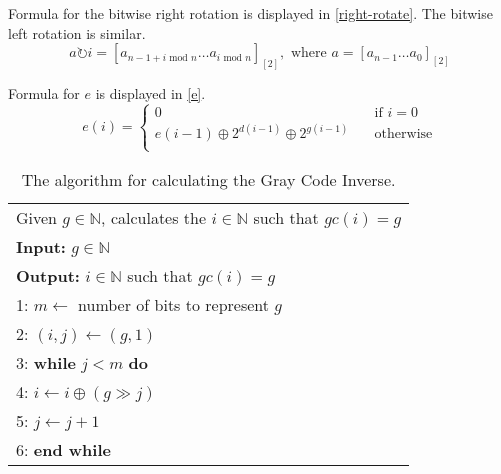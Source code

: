 \documentclass[10pt]{article}
\begin{document}
Formula for the bitwise right rotation is displayed in \ref{right-rotate}. The bitwise left rotation is similar.
\begin{equation}
  \label{right-rotate}
  a \rightturn i = \left[ a_{n - 1 + i\text{ mod }n} \ldots a_{i\text{ mod }n} \right]_{\left[ 2 \right]}, \text{ where } a = \left[ a_{n-1} \ldots a_0\right]_{\left[ 2 \right]} 
\end{equation}


Formula for $e$ is displayed in \ref{e}.
\begin{equation}
  \label{e}
  e(i) =  
    \begin{cases}
      0 & \quad \text{if $i = 0$}\\
      e(i - 1) \oplus 2^{d(i-1)} \oplus 2^{g(i-1)}& \quad \text{otherwise} \\
    \end{cases}
\end{equation}



\begin{table}
  \flushleft
  \begin{tabular}{l}
    \hline
    Given $g \in \mathbb{N}$, calculates the $i \in \mathbb{N}$ such that $gc\left( i \right) = g $ \\
    {\bf Input:} $g \in \mathbb{N}$\\
    {\bf Output:} $i \in \mathbb{N}$ such that $gc \left( i \right) = g $\\
    1: $ m \leftarrow $ number of bits to represent $g$ \\
    2: $ \left( i, j \right) \leftarrow \left( g, 1 \right) $ \\
    3: {\bf while} $ j < m $ {\bf do} \\
    4: \qquad $ i \leftarrow i \oplus \left( g \gg j \right)$ \\
    5: \qquad $ j \leftarrow j + 1$ \\
    6: {\bf end while} \\
    \hline
  \end{tabular}
  \caption{The algorithm for calculating the Gray Code Inverse. }
  \label{gray-code-inverse}
\end{table}
\end{document}
